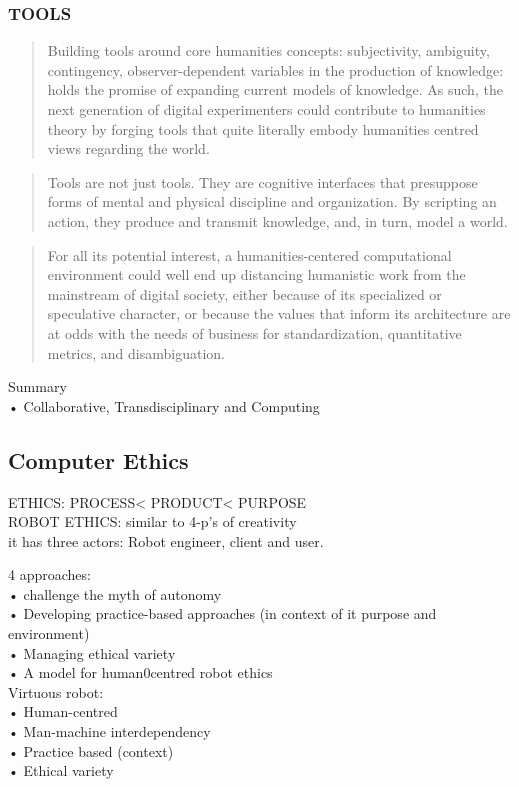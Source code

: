 \subsubsection*{TOOLS}
\begin{quote}
  Building tools around core humanities concepts: subjectivity, ambiguity, contingency, observer-dependent variables in the production of knowledge: holds the promise of expanding current models of knowledge. As such, the next generation of digital experimenters could contribute to humanities theory by forging tools that quite literally embody humanities centred views regarding the world. \citep[p.104]{Burdick2012}
\end{quote}

\begin{quote}
  Tools are not just tools. They are cognitive interfaces that presuppose forms of mental and physical discipline and organization. By scripting an action, they produce and transmit knowledge, and, in turn, model a world. \citep[p.105]{Burdick2012}
\end{quote}

\begin{quote}
  For all its potential interest, a humanities-centered computational environment could well end up distancing humanistic work from the mainstream of digital society, either because of its specialized or speculative character, or because the values that inform its architecture are at odds with the needs of business for standardization, quantitative metrics, and disambiguation. \citep[p.105]{Burdick2012}
\end{quote}

\begin{shaded}
Summary\\
•	Collaborative, Transdisciplinary and Computing
\end{shaded}

\subsection{Computer Ethics}

\begin{draft}
  ETHICS\@: PROCESS< PRODUCT< PURPOSE\\
  ROBOT ETHICS\@: similar to 4-p’s of creativity \citep{McBride2013}\\

  it has three actors: Robot engineer, client and user.

  4 approaches:\\
  •	challenge the myth of autonomy\\
  •	Developing practice-based approaches (in context of it purpose and environment)\\
  •	Managing ethical variety\\
  •	A model for human0centred robot ethics\\

  Virtuous robot:\\
  •	Human-centred\\
  •	Man-machine interdependency\\
  •	Practice based (context)\\
  •	Ethical variety
\end{draft}%
